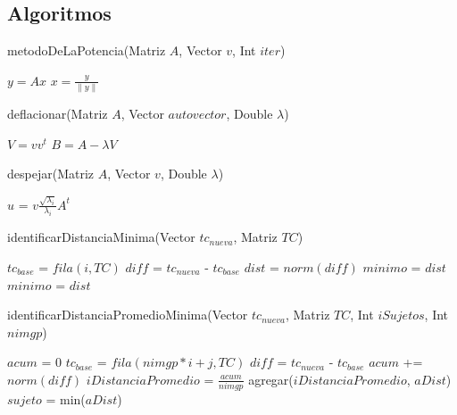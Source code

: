\subsection{Algoritmos}

\begin{algorithm}[!h]
\caption{metodoDeLaPotencia(Matriz $A$, Vector $v$, Int $iter$)}
\label{pseudo:metodoDeLaPotencia}
\begin{algorithmic}
    \STATE $y = Ax$
    \STATE $x = \frac{y}{\parallel y \parallel}$
  \ENDFOR
\end{algorithmic}
\end{algorithm}
\begin{algorithm}[!h]
\caption{deflacionar(Matriz $A$, Vector $autovector$, Double $\lambda$)}
\label{pseudo:deflacionar}
\begin{algorithmic}
  \STATE $V = vv^t$
  \STATE $B = A - \lambda V$
\end{algorithmic}
\end{algorithm}
\begin{algorithm}[!h]
\caption{despejar(Matriz $A$, Vector $v$, Double $\lambda$)}
\label{pseudo:despejar}
\begin{algorithmic}
  \STATE $u$ = $v\frac{ \sqrt{\lambda_{i} } }{ \lambda_{i} }  A^{t}$   
\end{algorithmic}
\end{algorithm}
\begin{algorithm}[!h]
\caption{identificarDistanciaMinima(Vector $tc_{nueva}$, Matriz $TC$)}
\label{pseudo:identificarDistanciMinima}
\begin{algorithmic}
    \STATE $tc_{base}$ = $fila(i, TC)$
    \STATE $diff$ = $tc_{nueva}$ - $tc_{base}$
    \STATE $dist$ = $norm(diff)$
      \STATE $minimo$ = $dist$
    \ENDIF
      \STATE $minimo$ = $dist$
    \ENDIF    
  \ENDFOR
\end{algorithmic}
\end{algorithm}
\begin{algorithm}[!h]
\caption{identificarDistanciaPromedioMinima(Vector $tc_{nueva}$, Matriz $TC$, Int $iSujetos$, Int $nimgp$)}
\label{pseudo:identificarDistanciaPromedioMinima}
\begin{algorithmic}
    \STATE $acum$ = $0$
      \STATE $tc_{base}$ = $fila(nimgp*i+j, TC)$
      \STATE $diff$ = $tc_{nueva}$ - $tc_{base}$
      \STATE $acum$ += $norm(diff)$      
    \ENDFOR
    \STATE $iDistanciaPromedio$ = $\frac{acum}{nimgp}$
    \STATE agregar($iDistanciaPromedio$, $aDist$)
  \ENDFOR
  \STATE $sujeto$ = min($aDist$)
\end{algorithmic}
\end{algorithm}
\FloatBarrier